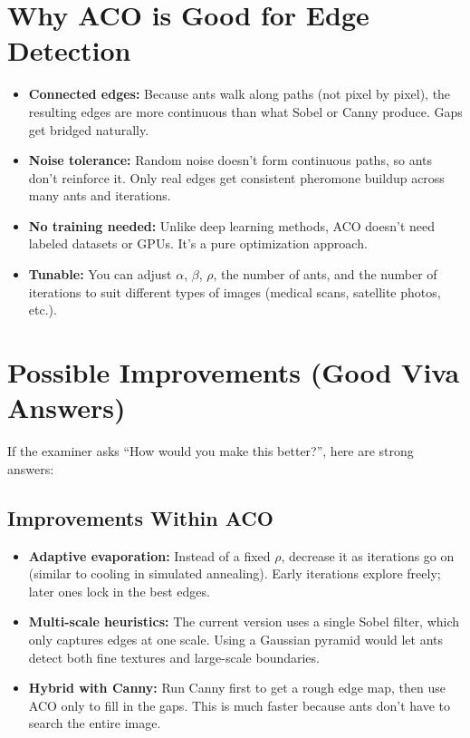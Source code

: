 \documentclass[12pt,a4paper]{article}
\begin{document}
\section{Why ACO is Good for Edge Detection}

\begin{tcolorbox}[title=Strengths, colback=blue!5!white, colframe=blue!75!black]
\begin{itemize}
    \item \textbf{Connected edges:} Because ants walk along paths (not pixel by pixel), the resulting edges are more continuous than what Sobel or Canny produce. Gaps get bridged naturally.
    \item \textbf{Noise tolerance:} Random noise doesn't form continuous paths, so ants don't reinforce it. Only real edges get consistent pheromone buildup across many ants and iterations.
    \item \textbf{No training needed:} Unlike deep learning methods, ACO doesn't need labeled datasets or GPUs. It's a pure optimization approach.
    \item \textbf{Tunable:} You can adjust $\alpha$, $\beta$, $\rho$, the number of ants, and the number of iterations to suit different types of images (medical scans, satellite photos, etc.).
\end{itemize}
\end{tcolorbox}

\section{Possible Improvements (Good Viva Answers)}

If the examiner asks ``How would you make this better?'', here are strong answers:

\subsection{Improvements Within ACO}
\begin{itemize}
    \item \textbf{Adaptive evaporation:} Instead of a fixed $\rho$, decrease it as iterations go on (similar to cooling in simulated annealing). Early iterations explore freely; later ones lock in the best edges.
    \item \textbf{Multi-scale heuristics:} The current version uses a single Sobel filter, which only captures edges at one scale. Using a Gaussian pyramid would let ants detect both fine textures and large-scale boundaries.
    \item \textbf{Hybrid with Canny:} Run Canny first to get a rough edge map, then use ACO only to fill in the gaps. This is much faster because ants don't have to search the entire image.
\end{itemize}
\end{document}
